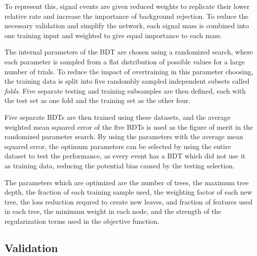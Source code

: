 To represent this, signal events are given reduced weights to replicate their lower relative rate and increase the importance of background rejection.
To reduce the necessary validation and simplify the network, each signal mass is combined into one training input and weighted to give equal importance to each mass.

The internal parameters of the BDT are chosen using a randomized search, where each parameter is sampled from a flat distribution of possible values for a large number of trials.
To reduce the impact of overtraining in this parameter choosing, the training data is split into five randombly sampled independent subsets called \emph{folds}.
Five separate testing and training subsamples are then defined, each with the test set as one fold and the training set as the other four.

Five separate BDTs are then trained using these datasets, and the average weighted mean squared error of the five BDTs is used as the figure of merit in the randomized parameter search.
By using the parameters with the average mean squared error, the optimum parameters can be selected by using the entire dataset to test the performance, as every event has a BDT which did not use it as training data, reducing the potential bias caused by the testing selection.

The parameters which are optimized are the number of trees, the maximum tree depth, the fraction of each training sample used, the weighting factor of each new tree, the loss reduction requred to create new leaves, and fraction of features used in each tree, the minimum weight in each node, and the strength of the regularization terms used in the objective function.


\subsection{Validation}

